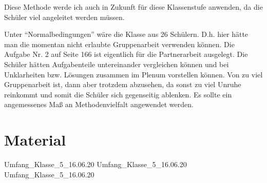 \documentclass[11pt]{scrartcl}
\begin{document}
Diese Methode werde ich auch in Zukunft für diese Klassenstufe anwenden, da die Schüler viel angeleitet werden müssen.

Unter \enquote{Normalbedingungen} wäre die Klasse aus 26 Schülern. D.h. hier hätte man die momentan nicht erlaubte Gruppenarbeit verwenden können. Die Aufgabe Nr. 2 auf Seite 166 ist eigentlich für die Partnerarbeit ausgelegt. Die Schüler hätten Aufgabenteile untereinander vergleichen können und bei Unklarheiten bzw. Lösungen zusammen im Plenum vorstellen können.
Von zu viel Gruppenarbeit ist, dann aber trotzdem abzusehen, da sonst zu viel Unruhe reinkommt und somit die Schüler sich gegenseitig ablenken.
Es sollte ein angemessenes Maß an Methodenvielfalt angewendet werden.

\newpage
\section{Material}
 {Umfang_Klasse_5_16.06.20}
 {Umfang_Klasse_5_16.06.20}
 {Umfang_Klasse_5_16.06.20}
\end{document}
